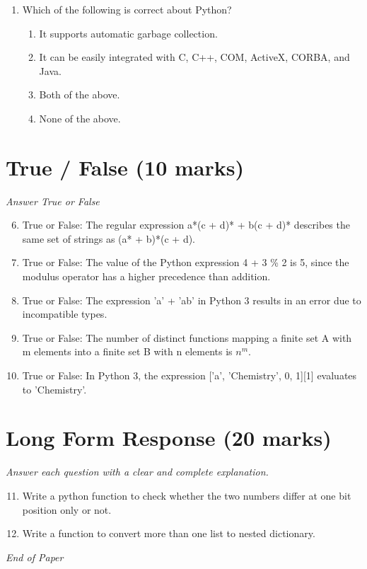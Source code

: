 \documentclass[12pt]{article}
\begin{document}
\begin{enumerate}[label=\arabic*.]
\begin{enumerate}[label=(\alph*)]
    \item A much higher amount of network traffic results
    \item Caching makes file migration impossible
\end{enumerate}
\item Which of the following is correct about Python?
\begin{enumerate}[label=(\alph*)]
    \item It supports automatic garbage collection.
    \item It can be easily integrated with C, C++, COM, ActiveX, CORBA, and Java.
    \item Both of the above.
    \item None of the above.
\end{enumerate}
\end{enumerate}

\section*{True / False (10 marks)}
\textit{Answer True or False}
\begin{enumerate}[label=\arabic*.]
\setcounter{enumi}{5}
\item True or False: The regular expression a*(c + d)* + b(c + d)* describes the same set of strings as (a* + b)*(c + d).
\item True or False: The value of the Python expression 4 + 3 \% 2 is 5, since the modulus operator has a higher precedence than addition.
\item True or False: The expression 'a' + 'ab' in Python 3 results in an error due to incompatible types.
\item True or False: The number of distinct functions mapping a finite set A with m elements into a finite set B with n elements is $n^m$.
\item True or False: In Python 3, the expression ['a', 'Chemistry', 0, 1][1] evaluates to 'Chemistry'.
\end{enumerate}

\section*{Long Form Response (20 marks)}
\textit{Answer each question with a clear and complete explanation.}
\begin{enumerate}[label=\arabic*.]
\setcounter{enumi}{10}
\item Write a python function to check whether the two numbers differ at one bit position only or not.
\item Write a function to convert more than one list to nested dictionary.
\end{enumerate}

\vfill
\noindent\textit{End of Paper}
\end{document}
